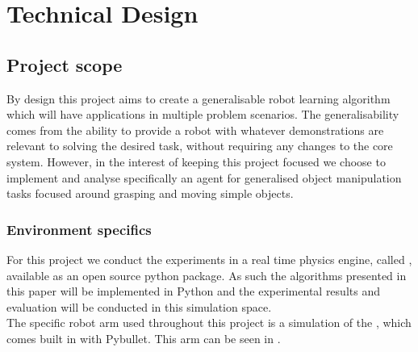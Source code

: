 \chapter{Technical Design}
\label{chap:technical}

\section{Project scope}
By design this project aims to create a generalisable robot learning algorithm which will have applications in multiple problem scenarios. The generalisability comes from the ability to provide a robot with whatever demonstrations are relevant to solving the desired task, without requiring any changes to the core system. However, in the interest of keeping this project focused we choose to implement and analyse specifically an agent for generalised object manipulation tasks focused around grasping and moving simple objects. 

\subsection{Environment specifics}
\label{subsec:pybullet-specifics}
For this project we conduct the experiments in a real time physics engine, called  \cite{pybullet}, available as an open source python package. As such the algorithms presented in this paper will be implemented in Python and the experimental results and evaluation will be conducted in this simulation space.\\
The specific robot arm used throughout this project is a simulation of the , which comes built in with Pybullet. This arm can be seen in .

